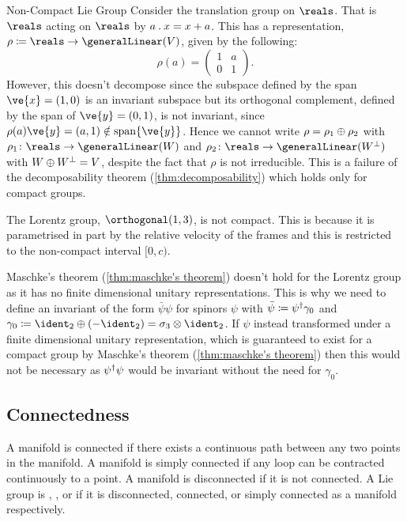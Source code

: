 \begin{exm}{Non-Compact Lie Group}{}
    Consider the translation group on \(\reals\).
    That is \(\reals\) acting on \(\reals\) by \(a \mathbin{.} x = x + a\).
    This has a representation, \(\rho \coloneqq \reals \to \generalLinear(V)\), given by the following:
    \begin{equation}
        \rho(a) =
        \begin{pmatrix}
            1 & a\\ 0 & 1
        \end{pmatrix}
        .
    \end{equation}
    However, this doesn't decompose since the subspace defined by the span \(\ve{x} = (1, 0)\) is an invariant subspace but its orthogonal complement, defined by the span of \(\ve{y} = (0, 1)\), is not invariant, since \(\rho(a)\ve{y} = (a, 1) \notin \spn \{\ve{y}\}\).
    Hence we cannot write \(\rho = \rho_1 \oplus \rho_2\) with \(\rho_1 \colon \reals \to \generalLinear(W)\) and \(\rho_2 \colon \reals \to \generalLinear(W^{\bot})\) with \(W \oplus W^{\bot} = V\), despite the fact that \(\rho\) is not irreducible.
    This is a failure of the decomposability theorem (\cref{thm:decomposability}) which holds only for compact groups.
\end{exm}

\begin{exm}{}{}
    The Lorentz group, \(\orthogonal(1, 3)\), is not compact.
    This is because it is parametrised in part by the relative velocity of the frames and this is restricted to the non-compact interval \([0, c)\).
    
    Maschke's theorem (\cref{thm:maschke's theorem}) doesn't hold for the Lorentz group as it has no finite dimensional unitary representations.
    This is why we need to define an invariant of the form \(\bar{\psi}\psi\) for spinors \(\psi\) with \(\bar{\psi} \coloneqq \psi^\dagger \gamma_0\) and \(\gamma_0 \coloneqq \ident_2 \directsum (-\ident_2) = \sigma_3 \directproduct \ident_2\).
    If \(\psi\) instead transformed under a finite dimensional unitary representation, which is guaranteed to exist for a compact group by Maschke's theorem (\cref{thm:maschke's theorem}) then this would not be necessary as \(\psi^\dagger \psi\) would be invariant without the need for \(\gamma_0\).
\end{exm}

\subsection{Connectedness}
\begin{dfn}{}{}
    A manifold is connected if there exists a continuous path between any two points in the manifold.
    A manifold is simply connected if any loop can be contracted continuously to a point.
    A manifold is disconnected if it is not connected.
    A Lie group is , , or  if it is disconnected, connected, or simply connected as a manifold respectively.
\end{dfn}

